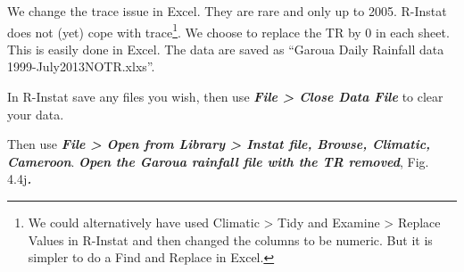 \documentclass[
  letterpaper,
  DIV=11,
  numbers=noendperiod]{scrreprt}
\begin{document}
We change the trace issue in Excel. They are rare and only up to 2005.
R-Instat does not (yet) cope with trace\footnote{We could alternatively
  have used Climatic \textgreater{} Tidy and Examine \textgreater{}
  Replace Values in R-Instat and then changed the columns to be numeric.
  But it is simpler to do a Find and Replace in Excel.}. We choose to
replace the TR by 0 in each sheet. This is easily done in Excel. The
data are saved as ``Garoua Daily Rainfall data 1999-July2013NOTR.xlxs''.

In R-Instat save any files you wish, then use \textbf{\emph{File
\textgreater{} Close Data File}} to clear your data.

Then use \textbf{\emph{File \textgreater{} Open from Library
\textgreater{} Instat file, Browse, Climatic, Cameroon}}.
\textbf{\emph{Open the Garoua rainfall file with the TR removed}}, Fig.
4.4j\textbf{\emph{.}}
\end{document}
